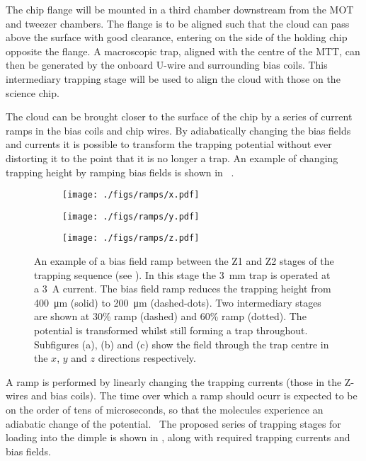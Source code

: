 The chip flange will be mounted in a third chamber downstream from the MOT and
tweezer chambers. The flange is to be aligned such that the cloud can pass above
the surface with good clearance, entering on the side of the holding chip opposite
the flange. A macroscopic trap, aligned with the centre of the MTT, can then be
generated by the onboard U-wire and surrounding bias coils. This intermediary
trapping stage will be used to align the cloud with those on the science chip.

The cloud can be brought closer to the surface of the chip by a series of
current ramps in the bias coils and chip wires. By adiabatically changing the
bias fields and currents it is possible to transform the trapping potential
without ever distorting it to the point that it is no longer a trap. An example
of changing trapping height by ramping bias fields is shown in
~. 

\begin{figure}[ht]
  \centering
  \begin{subfigure}{0.6\textwidth}
    \centering
    \texttt{[image: ./figs/ramps/x.pdf]}
    \caption{}
  \end{subfigure}
  \begin{subfigure}{0.6\textwidth}
    \centering
    \texttt{[image: ./figs/ramps/y.pdf]}
    \caption{}
  \end{subfigure}
  \begin{subfigure}{0.6\textwidth}
    \centering
    \texttt{[image: ./figs/ramps/z.pdf]}
    \caption{}
  \end{subfigure}
  \caption{
    An example of a bias field ramp between the Z1 and Z2 stages of the trapping
    sequence (see ). In this stage the
    \SI{3}{\milli\metre} trap is operated at a \SI{3}{\ampere} current. The bias
    field ramp reduces the trapping height from \SI{400}{\micro\metre} (solid)
    to \SI{200}{\micro\metre} (dashed-dots). Two intermediary stages are shown
    at 30\% ramp (dashed) and 60\% ramp (dotted). The potential is transformed
    whilst still forming a trap throughout. Subfigures (a), (b) and (c) show the
    field through the trap centre in the $x$, $y$ and $z$ directions
    respectively.
  }
  \label{experiment:fig:ramptraps}
\end{figure}

A ramp is performed by linearly changing the trapping currents (those in the
Z-wires and bias coils). The time over which a ramp should ocurr is expected to
be on the order of tens of microseconds, so that the molecules experience an
adiabatic change of the potential.~\cite{Boehi2009} The proposed series of
trapping stages for loading into the dimple is shown in
, along with required trapping currents and
bias fields.

